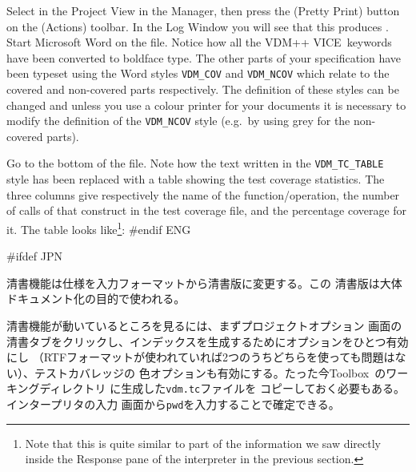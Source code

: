 \documentclass[\pformat,12pt]{article}
\newcommand{\vdmslpp}{VDM-SL}
\newcommand{\Toolbox}{Toolbox}
\newcommand{\vdmslpp}{VDM++}
\newcommand{\Toolbox}{Toolbox}
\renewcommand{\vdmslpp}{VDM++ VICE}
\newcommand{\guicmd}[1]{{\sf #1}}
\newcommand{\guicmd}[1]{{\gt #1}}
\begin{document}
Select  in the \guicmd{Project View} in the
\guicmd{Manager}, then press the %
(\guicmd{Pretty Print}) button on the
(\guicmd{Actions}) toolbar. In the \guicmd{Log Window} you will
see that this produces . Start Microsoft Word on the
file. Notice how all the \vdmslpp\ keywords have been converted to
boldface type. The
other parts of your specification have been typeset using the Word
styles {\tt VDM\_COV} and {\tt VDM\_NCOV} which relate to the covered
and non-covered parts respectively. The definition of these styles can
be changed and unless you use a colour printer for your documents it
is necessary to modify the definition of the {\tt VDM\_NCOV} style
(e.g.\ by using grey for the non-covered parts).

Go to the bottom of the  file. Note how the
text written in the {\tt VDM\_TC\_TABLE} style has been replaced with a
table showing the test coverage statistics. The three columns give
respectively the name of the function/operation, the number of calls
of that construct in 
the test coverage file, and the percentage coverage for it. The table
looks like\footnote{Note that this is quite similar to part of the
information we saw directly inside the \guicmd{Response} pane of
the interpreter in the previous section.}:
#endif ENG

#ifdef JPN

清書機能は仕様を入力フォーマットから清書版に変更する。この
清書版は大体ドキュメント化の目的で使われる。
  
清書機能が動いているところを見るには、まず\guicmd{プロジェクトオプション} 画面の
\guicmd{清書}タブをクリックし、インデックスを生成するためにオプションをひとつ有効にし
（RTFフォーマットが使われていれば2つのうちどちらを使っても問題はない）、テストカバレッジの
色オプションも有効にする。たった今\Toolbox\ のワーキングディレクトリ に生成した{\tt vdm.tc}ファイルを
コピーしておく必要もある。インタープリタの\guicmd{入力} 画面から{\tt pwd}を入力することで確定できる。
\end{document}
